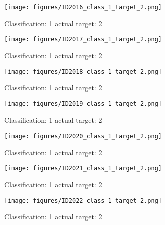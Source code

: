 \begin{figure}[h!]
\begin{center}
\texttt{[image: figures/ID2016\_class\_1\_target\_2.png]}
\end{center}
\caption{ Classification: 1 actual target: 2}
\label{fig:ID2016_class_1_target_2}
\end{figure}
\begin{figure}[h!]
\begin{center}
\texttt{[image: figures/ID2017\_class\_1\_target\_2.png]}
\end{center}
\caption{ Classification: 1 actual target: 2}
\label{fig:ID2017_class_1_target_2}
\end{figure}
\begin{figure}[h!]
\begin{center}
\texttt{[image: figures/ID2018\_class\_1\_target\_2.png]}
\end{center}
\caption{ Classification: 1 actual target: 2}
\label{fig:ID2018_class_1_target_2}
\end{figure}
\begin{figure}[h!]
\begin{center}
\texttt{[image: figures/ID2019\_class\_1\_target\_2.png]}
\end{center}
\caption{ Classification: 1 actual target: 2}
\label{fig:ID2019_class_1_target_2}
\end{figure}
\begin{figure}[h!]
\begin{center}
\texttt{[image: figures/ID2020\_class\_1\_target\_2.png]}
\end{center}
\caption{ Classification: 1 actual target: 2}
\label{fig:ID2020_class_1_target_2}
\end{figure}
\begin{figure}[h!]
\begin{center}
\texttt{[image: figures/ID2021\_class\_1\_target\_2.png]}
\end{center}
\caption{ Classification: 1 actual target: 2}
\label{fig:ID2021_class_1_target_2}
\end{figure}
\begin{figure}[h!]
\begin{center}
\texttt{[image: figures/ID2022\_class\_1\_target\_2.png]}
\end{center}
\caption{ Classification: 1 actual target: 2}
\label{fig:ID2022_class_1_target_2}
\end{figure}

